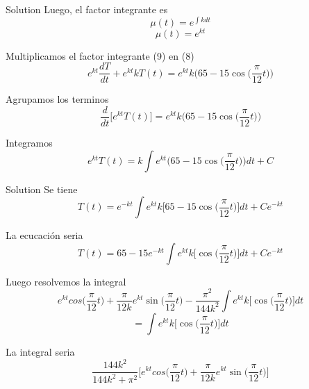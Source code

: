 \documentclass[10 pt]{beamer}
\begin{document}
\begin{frame}
    \begin{block}{Solution}
        Luego, el factor integrante es
        \begin{equation*}
            \mu(t) = e^{\int kdt}
        \end{equation*}
        \begin{equation}
            \mu(t) = e^{kt}
        \end{equation}

        Multiplicamos el factor integrante (9) en (8)
        \begin{equation}
            e^{kt}\dfrac{dT}{dt} + e^{kt}kT(t) = e^{kt}k \bigg(65 - 15\cos\bigg(\dfrac{\pi}{12}t \bigg) \bigg)
        \end{equation}

        Agrupamos los terminos
        \begin{equation}
            \dfrac{d}{dt} \bigg[e^{kt}T(t)\bigg]  = e^{kt}k \bigg(65 - 15\cos\bigg(\dfrac{\pi}{12}t \bigg) \bigg)
        \end{equation}

        Integramos
        \begin{equation}
            e^{kt}T(t)= k \int e^{kt} \bigg(65 - 15\cos\bigg(\dfrac{\pi}{12}t \bigg) \bigg)dt + C
        \end{equation}
    \end{block}
\end{frame}

\begin{frame}
    \begin{block}{Solution}
        Se tiene
        \begin{equation}
            T(t)= e^{-kt} \int e^{kt} k\bigg[65 - 15\cos\bigg(\dfrac{\pi}{12}t \bigg) \bigg]dt + Ce^{-kt}
        \end{equation}

        La ecucación seria
        \begin{equation}
            T(t)= 65 - 15e^{-kt} \int e^{kt} k\bigg[\cos\bigg(\dfrac{\pi}{12}t \bigg) \bigg]dt + Ce^{-kt}
        \end{equation}

        Luego resolvemos la integral
        \begin{equation}
            e^{kt}cos\bigg(\dfrac{\pi}{12}t\bigg) + \dfrac{\pi}{12k}e^{kt}\sin\bigg(\dfrac{\pi}{12}t\bigg) - \dfrac{\pi^{2}}{144k^{2}}\int e^{kt} k\bigg[\cos\bigg(\dfrac{\pi}{12}t \bigg) \bigg]dt
        \end{equation}
        \begin{equation}
            = \int e^{kt} k\bigg[\cos\bigg(\dfrac{\pi}{12}t \bigg) \bigg]dt
        \end{equation}

        La integral seria
        \begin{equation}
            \dfrac{144k^{2}}{144k^{2} + \pi^{2}} \bigg[e^{kt}cos\bigg(\dfrac{\pi}{12}t\bigg) + \dfrac{\pi}{12k}e^{kt}\sin\bigg(\dfrac{\pi}{12}t\bigg) \bigg]
        \end{equation}
    \end{block}

\end{frame}
\end{document}
